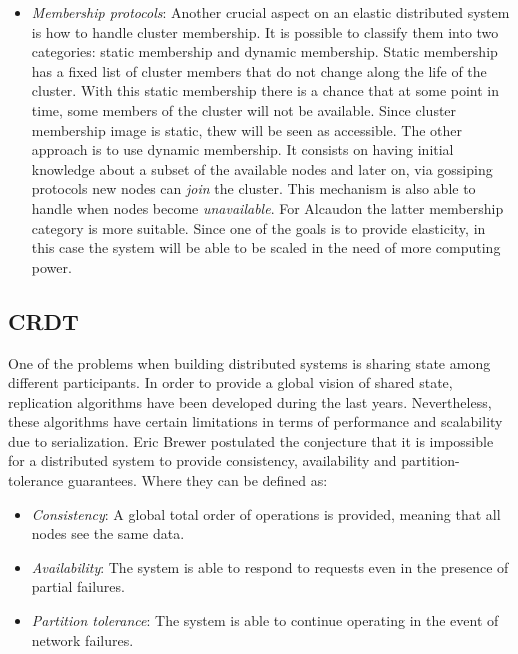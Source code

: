 \begin{itemize}
\item \textit{Membership protocols}: Another crucial aspect on an elastic
  distributed system is how to handle cluster membership. It is possible to
  classify them into two categories: static membership and dynamic membership.
  Static membership has a fixed list of cluster members that do not change along
  the life of the cluster. With this static membership there is a chance that at
  some point in time, some members of the cluster will not be available. Since
  cluster membership image is static, thew will be seen as accessible. The other
  approach is to use dynamic membership. It consists on having initial knowledge
  about a subset of the available nodes and later on, via gossiping
  protocols\cite{gossip} new nodes can \textit{join} the cluster. This mechanism
  is also able to handle when nodes become \textit{unavailable}. For Alcaudon
  the latter membership category is more suitable. Since one of the goals is to
  provide elasticity, in this case the system will be able to be scaled in the
  need of more computing power.
\end{itemize}

\subsection{CRDT}

One of the problems when building distributed systems is sharing state among
different participants. In order to provide a global vision of shared state,
replication\cite{book:replication} algorithms have been developed during the last
years. Nevertheless, these algorithms have certain limitations in terms of
performance and scalability due to serialization. Eric Brewer postulated the
conjecture that it is impossible for a distributed system to provide 
consistency, availability and partition-tolerance guarantees. Where
they can be defined as:

\begin{itemize}
\item \textit{Consistency}: A global total order of operations is provided,
  meaning that all nodes see the same data.
\item \textit{Availability}: The system is able to respond to requests even in
  the presence of partial failures.
\item \textit{Partition tolerance}: The system is able to continue operating in
  the event of network failures.
\end{itemize}

